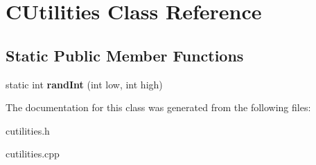 \hypertarget{class_c_utilities}{}\section{C\+Utilities Class Reference}
\label{class_c_utilities}
\subsection*{Static Public Member Functions}
\begin{DoxyCompactItemize}
\item 
\mbox{\label{class_c_utilities_a0ddde77c9d7a38f2cb7da3ee3a1d1efa}} 
static int {\bfseries rand\+Int} (int low, int high)
\end{DoxyCompactItemize}


The documentation for this class was generated from the following files\+:\begin{DoxyCompactItemize}
\item 
cutilities.\+h\item 
cutilities.\+cpp\end{DoxyCompactItemize}
